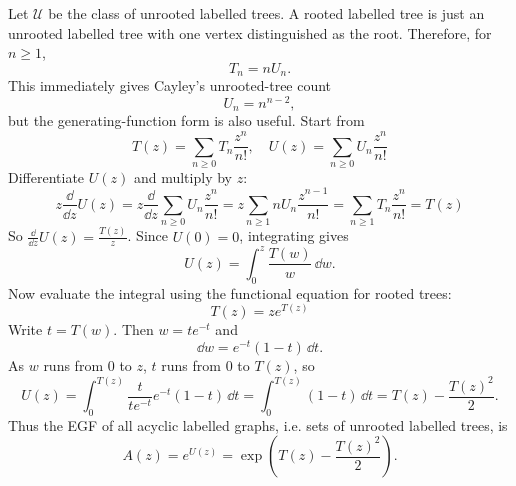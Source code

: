 
Let $\mathcal{U}$ be the class of unrooted labelled trees. A rooted labelled tree is just an
unrooted labelled tree with one vertex distinguished as the root. Therefore, for $n \geq 1$,
\begin{equation*}
    T_n = nU_n.
\end{equation*}
This immediately gives Cayley's unrooted-tree count
\begin{equation*}
    U_n = n^{n - 2},
\end{equation*}
but the generating-function form is also useful. Start from
\begin{equation*}
    T(z) = \sum_{n \geq 0} T_{n} \frac{z^{n}}{n!}, \quad
    U(z) = \sum_{n \geq 0} U_{n} \frac{z^{n}}{n!}
\end{equation*}
Differentiate $U(z)$ and multiply by $z$:
\begin{equation*}
    z \frac{\dd}{\dd z} U(z) = z \frac{\dd}{\dd z} \sum_{n \geq 0} U_{n} \frac{z^{n}}{n!} = z \sum_{n \geq 1} nU_{n} \frac{z^{n - 1}}{n!}
        = \sum_{n \geq 1} T_{n} \frac{z^{n}}{n!} = T(z)
\end{equation*}
So $\frac{\dd}{\dd z} U(z) = \frac{T(z)}{z}$. Since $U(0) = 0$, integrating gives
\begin{equation*}
    U(z) = \int_{0}^{z} \frac{T(w)}{w}\,\dd w.
\end{equation*}
Now evaluate the integral using the functional equation for rooted trees:
\begin{equation*}
    T(z) = ze^{T(z)}
\end{equation*}
Write $t = T(w)$. Then $w = te^{-t}$ and
\begin{equation*}
    \dd w = e^{-t}(1 - t)\,\dd t.
\end{equation*}
As $w$ runs from $0$ to $z$, $t$ runs from $0$ to $T(z)$, so
\begin{equation*}
    U(z)
        = \int_{0}^{T(z)} \frac{t}{te^{-t}} e^{-t}(1 - t)\,\dd t
        = \int_{0}^{T(z)} (1 - t)\,\dd t
        = T(z) - \frac{T(z)^{2}}{2}.
\end{equation*}
Thus the EGF of all acyclic labelled graphs, i.e. sets of unrooted labelled trees, is
\begin{equation*}
    A(z) = e^{U(z)} = \exp\left(T(z) - \frac{T(z)^2}{2}\right).
\end{equation*}


